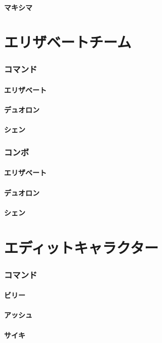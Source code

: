 \documentclass[a4j,11pt]{jarticle}
\begin{document}
\subsection{マキシマ}
\part{エリザベートチーム}%
\section{コマンド}
\subsection{エリザベート}
\subsection{デュオロン}
\subsection{シェン}
\section{コンボ}
\subsection{エリザベート}
\subsection{デュオロン}
\subsection{シェン}
\part{エディットキャラクター}%
\section{コマンド}
\subsection{ビリー}
\subsection{アッシュ}
\subsection{サイキ}
\end{document}
